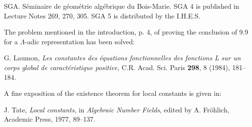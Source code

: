 \documentclass[10pt]{article}
\begin{document}
\noindent SGA. Séminaire de géométrie algébrique du Bois-Marie. SGA 4 is published in Lecture Notes 269, 270, 305. SGA 5 is distributed by the I.H.E.S.

\medskip
\noindent The problem mentioned in the introduction, p. 4, of proving the conclusion of 9.9 for a \(\Lambda\)-adic representation has been solved:

\noindent G. Laumon, \emph{Les constantes des équations fonctionnelles des fonctions L sur un corps global de caractéristique positive}, C.R. Acad. Sci. Paris \textbf{298}, 8 (1984), 181--184.

\medskip
\noindent A fine exposition of the existence theorem for local constants is given in:

\noindent J. Tate, \emph{Local constants}, in \emph{Algebraic Number Fields}, edited by A. Fröhlich, Academic Press, 1977, 89--137.
\end{document}
